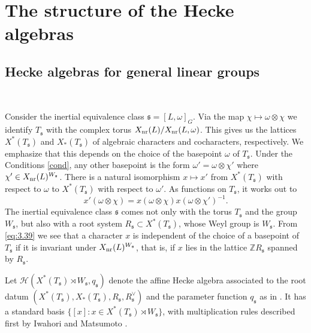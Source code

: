 \documentclass[11pt]{amsart}
\theoremstyle{definition}
\begin{document}
\section{The structure of the Hecke algebras}
\label{sec:Hecke}

\subsection{Hecke algebras for general linear groups} \
\label{subsec:Secherre}

Consider the inertial equivalence class ${{\mathfrak s}} = [L,\omega]_G$.
Via the map $\chi \mapsto \omega \otimes \chi$ we identify $T_{{\mathfrak s}}$ with the complex torus
$X_{{\rm nr}} (L) / X_{{\rm nr}} (L,\omega)$. This gives us the lattices $X^* (T_{{\mathfrak s}})$ and $X_* (T_{{\mathfrak s}})$
of algebraic characters and cocharacters, respectively. We emphasize that this depends on
the choice of the basepoint $\omega$ of $T_{{\mathfrak s}}$. Under the Conditions \ref{cond}, any other
basepoint is the form $\omega' = \omega \otimes \chi'$ where $\chi' \in X_{{\rm nr}} (L)^{W_{{\mathfrak s}}}$.
There is a natural isomorphism $x \mapsto x'$ from $X^* (T_{{\mathfrak s}})$ with respect to $\omega$
to $X^* (T_{{\mathfrak s}})$ with respect to $\omega'$. As functions on $T_{{\mathfrak s}}$, it works out to
\begin{equation}\label{eq:3.39}
x' (\omega \otimes \chi) = x (\omega \otimes \chi) x (\omega \otimes \chi')^{-1} .
\end{equation}
The inertial equivalence class ${{\mathfrak s}}$ comes not only with the torus $T_{{\mathfrak s}}$ and the group
$W_{{\mathfrak s}}$, but also with a root system $R_{{\mathfrak s}} \subset X^* (T_{{\mathfrak s}})$, whose Weyl group is $W_{{\mathfrak s}}$.
From \eqref{eq:3.39} we see that a character $x$ is independent of the choice of a 
basepoint of $T_{{\mathfrak s}}$ if it is invariant under $X_{{\rm nr}} (L)^{W_{{\mathfrak s}}}$, that is, if $x$ lies in
the lattice ${\mathbb Z} R_{{\mathfrak s}}$ spanned by $R_{{\mathfrak s}}$.

Let ${{\mathcal H}} (X^* (T_{{\mathfrak s}}) \rtimes W_{{\mathfrak s}},q_{{\mathfrak s}})$ denote the affine Hecke algebra
associated to the root datum $(X^* (T_{{\mathfrak s}}), X_* (T_{{\mathfrak s}}), R_{{\mathfrak s}}, R^\vee_{{\mathfrak s}})$
and the parameter function $q_{{\mathfrak s}}$ as in \cite{Sec3}. It has a standard basis 
$\{[x] : x \in X^* (T_{{\mathfrak s}}) \rtimes W_{{\mathfrak s}} \}$, with multiplication rules described first 
by Iwahori and Matsumoto \cite{IwMa}. \label{i:24}
\end{document}
